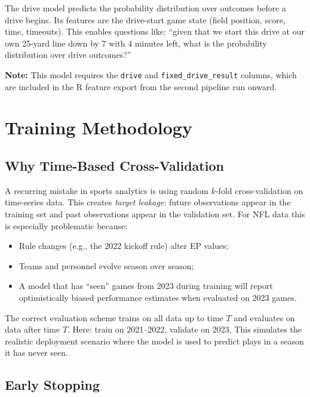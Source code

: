 \documentclass[11pt]{article}
\begin{document}
The drive model predicts the probability distribution over outcomes before
a drive begins. Its features are the drive-start game state (field position,
score, time, timeouts). This enables questions like: ``given that we start
this drive at our own 25-yard line down by 7 with 4 minutes left, what is
the probability distribution over drive outcomes?''

\textbf{Note:} This model requires the \texttt{drive} and
\texttt{fixed\_drive\_result} columns, which are included in the R feature
export from the second pipeline run onward.

\section{Training Methodology}
\label{sec:training}

\subsection{Why Time-Based Cross-Validation}

A recurring mistake in sports analytics is using random $k$-fold cross-validation
on time-series data. This creates \emph{target leakage}: future observations
appear in the training set and past observations appear in the validation set.
For NFL data this is especially problematic because:
\begin{itemize}
  \item Rule changes (e.g., the 2022 kickoff rule) alter EP values;
  \item Teams and personnel evolve season over season;
  \item A model that has ``seen'' games from 2023 during training will
    report optimistically biased performance estimates when evaluated on 2023 games.
\end{itemize}

The correct evaluation scheme trains on all data up to time $T$ and evaluates
on data after time $T$. Here: train on 2021--2022, validate on 2023. This simulates
the realistic deployment scenario where the model is used to predict plays in
a season it has never seen.

\subsection{Early Stopping}
\end{document}
